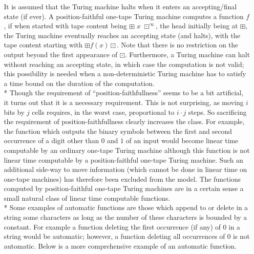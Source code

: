 \documentclass{LMCS}
\theoremstyle{plain}\newtheorem{athm}[thm]{Theorem}
\theoremstyle{plain}\newtheorem{aprop}[thm]{Proposition}
\theoremstyle{plain}\newtheorem{aprob}[thm]{Open Problem}
\theoremstyle{plain}\newtheorem{acor}[thm]{Corollary}
\theoremstyle{plain}\newtheorem{alem}[thm]{Lemma}
\theoremstyle{definition}\newtheorem{adefn}[thm]{Definition}
\theoremstyle{definition}\newtheorem{arem}[thm]{Remark}
\theoremstyle{plain}\newtheorem{aexmp}[thm]{Example}
\theoremstyle{plain}\newtheorem{aclm}[thm]{Claim}
\def\sp{\\*\indent}
\begin{document}
It is assumed that the Turing machine halts when it enters an accepting/final 
state (if ever).
A position-faithful one-tape Turing machine computes a function $f$, if
when started with tape content being $\boxplus$ $x$ $\boxdot^{\infty}$,
the head initially being at $\boxplus$, the Turing machine eventually
reaches an accepting state (and halts), 
with the tape content starting with $\boxplus f(x) \boxdot$.
Note that there is no restriction on the output beyond the
first appearance of $\boxdot$. Furthermore, a Turing machine can halt
without reaching an accepting state, in which case the computation is
not valid; this possibility is needed when a non-deterministic Turing
machine has to satisfy a time bound on the duration of the computation.
\sp
Though the requirement of ``position-faithfullness'' seems to be a bit
artificial, it turns out that it is a necessary requirement. This is
not surprising, as moving $i$ bits by $j$ cells requires, in the worst case,
proportional to $i \cdot j$ steps. So sacrificing the requirement
of position-faithfullness clearly increases the class. For example,
the function which outputs the binary symbols between the first and
second occurrence of a digit other than $0$ and $1$ of an input would
become linear time computable by an ordinary one-tape Turing machine
although this function is not linear time
computable by a position-faithful one-tape Turing machine. Such an
additional side-way to move information (which cannot
be done in linear time on one-tape machines) 
has therefore been excluded from the model.
The functions computed by position-faithful one-tape Turing
machines are in a certain sense a small natural class of linear time
computable functions.
\sp
Some examples of automatic functions are those which append to or delete in
a string some characters as long as the number of these characters is bounded
by a constant. For example a function deleting the first 
occurrence (if any)
of $0$ in a string would be automatic; however, a function deleting all
occurrences of $0$ is not automatic. Below is a more comprehensive example
of an automatic function.
\end{document}
